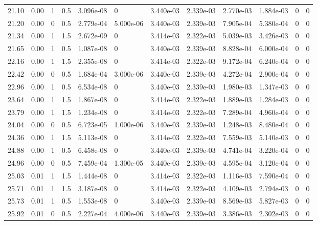 \documentclass[preview]{standalone}
\begin{document}
{{{\begin{tabular}{L{1.2cm}C{1.2cm} C{0.3cm}C{0.5cm} C{1.4cm}C{1.4cm} C{1.4cm}C{1.4cm} C{1.6cm}C{1.6cm} C{1.6cm}C{1.6cm}}
  21.10  &  0.00  & 1     & 0.5 &  3.096e-08  & 0  &  3.440e-03&   2.339e-03& 2.770e-03 & 1.884e-03   &  0 & 0  \\ 
  21.20  &  0.00  & 0     & 0.5 &  2.779e-04  & 5.000e-06  &  3.440e-03&   2.339e-03& 7.905e-04 & 5.380e-04   &  0 & 0  \\ 
  21.34  &  0.00  & 1     & 1.5 &  2.672e-09  & 0  &  3.414e-03&   2.322e-03& 5.039e-03 & 3.426e-03   &  0 & 0  \\ 
  21.65  &  0.00  & 1     & 0.5 &  1.087e-08  & 0  &  3.440e-03&   2.339e-03& 8.828e-04 & 6.000e-04   &  0 & 0  \\ 
  22.16  &  0.00  & 1     & 1.5 &  2.355e-08  & 0  &  3.414e-03&   2.322e-03& 9.172e-04 & 6.240e-04   &  0 & 0  \\ 
  22.42  &  0.00  & 0     & 0.5 &  1.684e-04  & 3.000e-06  &  3.440e-03&   2.339e-03& 4.272e-04 & 2.900e-04   &  0 & 0  \\ 
  22.96  &  0.00  & 1     & 0.5 &  6.534e-08  & 0  &  3.440e-03&   2.339e-03& 1.980e-03 & 1.347e-03   &  0 & 0  \\ 
  23.64  &  0.00  & 1     & 1.5 &  1.867e-08  & 0  &  3.414e-03&   2.322e-03& 1.889e-03 & 1.284e-03   &  0 & 0  \\ 
  23.79  &  0.00  & 1     & 1.5 &  1.234e-08  & 0  &  3.414e-03&   2.322e-03& 7.289e-04 & 4.960e-04   &  0 & 0  \\ 
  24.04  &  0.00  & 0     & 0.5 &  6.723e-05  & 1.000e-06  &  3.440e-03&   2.339e-03& 1.248e-03 & 8.480e-04   &  0 & 0  \\ 
  24.36  &  0.00  & 1     & 1.5 &  5.113e-08  & 0  &  3.414e-03&   2.322e-03& 7.559e-03 & 5.140e-03   &  0 & 0  \\ 
  24.88  &  0.00  & 1     & 0.5 &  6.458e-08  & 0  &  3.440e-03&   2.339e-03& 4.741e-04 & 3.220e-04   &  0 & 0  \\ 
  24.96  &  0.00  & 0     & 0.5 &  7.459e-04  & 1.300e-05  &  3.440e-03&   2.339e-03& 4.595e-04 & 3.120e-04   &  0 & 0  \\ 
  25.03  &  0.01  & 1     & 1.5 &  1.444e-08  & 0  &  3.414e-03&   2.322e-03& 1.116e-03 & 7.590e-04   &  0 & 0  \\ 
  25.71  &  0.01  & 1     & 1.5 &  3.187e-08  & 0  &  3.414e-03&   2.322e-03& 4.109e-03 & 2.794e-03   &  0 & 0  \\ 
  25.73  &  0.01  & 1     & 0.5 &  1.553e-08  & 0  &  3.440e-03&   2.339e-03& 8.569e-03 & 5.827e-03   &  0 & 0  \\ 
  25.92  &  0.01  & 0     & 0.5 &  2.227e-04  & 4.000e-06  &  3.440e-03&   2.339e-03& 3.386e-03 & 2.302e-03   &  0 & 0  \\ 

\end{tabular}}}}
\end{document}
